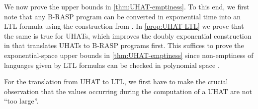 We now prove the upper bounds in \cref{thm:UHAT-emptiness}.
To this end, we first note that any B-RASP program can be converted in exponential time into an LTL formula
using the construction from \citep{YangCA24}.
In \cref{prop:UHAT-LTL} we prove that the same is true for UHATs,
which improves the doubly exponential construction in \citep{YangCA24} that translates UHATs to B-RASP programs first.
This suffices to prove the exponential-space upper bounds in \cref{thm:UHAT-emptiness} since
non-emptiness of languages given by LTL formulas can be checked in polynomial space \citep{SistlaC85}.


For the translation from UHAT to LTL, we first have to make the crucial observation 
that the values occurring during the computation of a UHAT are not ``too large''.

